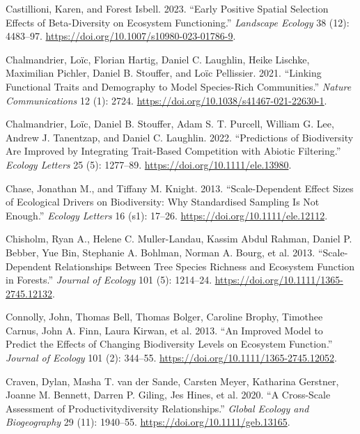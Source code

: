 \documentclass[
  letterpaper,
  DIV=11,
  numbers=noendperiod]{scrartcl}
\newlength{\cslhangindent}
\newenvironment{CSLReferences}[2] %
 {\begin{list}{}{%
  \setlength{\itemindent}{0pt}
  \setlength{\leftmargin}{0pt}
  \setlength{\parsep}{0pt}
  \ifodd #1
   \setlength{\leftmargin}{\cslhangindent}
   \setlength{\itemindent}{-1\cslhangindent}
  \fi
  \setlength{\itemsep}{#2\baselineskip}}}
 {\end{list}}
\begin{document}
\begin{CSLReferences}{1}{0}
Castillioni, Karen, and Forest Isbell. 2023. {``Early Positive Spatial
Selection Effects of Beta-Diversity on Ecosystem Functioning.''}
\emph{Landscape Ecology} 38 (12): 4483--97.
\url{https://doi.org/10.1007/s10980-023-01786-9}.

Chalmandrier, Loïc, Florian Hartig, Daniel C. Laughlin, Heike Lischke,
Maximilian Pichler, Daniel B. Stouffer, and Loïc Pellissier. 2021.
{``Linking Functional Traits and Demography to Model Species-Rich
Communities.''} \emph{Nature Communications} 12 (1): 2724.
\url{https://doi.org/10.1038/s41467-021-22630-1}.

Chalmandrier, Loïc, Daniel B. Stouffer, Adam S. T. Purcell, William G.
Lee, Andrew J. Tanentzap, and Daniel C. Laughlin. 2022. {``Predictions
of Biodiversity Are Improved by Integrating Trait-Based Competition with
Abiotic Filtering.''} \emph{Ecology Letters} 25 (5): 1277--89.
\url{https://doi.org/10.1111/ele.13980}.

Chase, Jonathan M., and Tiffany M. Knight. 2013. {``Scale-Dependent
Effect Sizes of Ecological Drivers on Biodiversity: Why Standardised
Sampling Is Not Enough.''} \emph{Ecology Letters} 16 (s1): 17--26.
\url{https://doi.org/10.1111/ele.12112}.

Chisholm, Ryan A., Helene C. Muller-Landau, Kassim Abdul Rahman, Daniel
P. Bebber, Yue Bin, Stephanie A. Bohlman, Norman A. Bourg, et al. 2013.
{``Scale-Dependent Relationships Between Tree Species Richness and
Ecosystem Function in Forests.''} \emph{Journal of Ecology} 101 (5):
1214--24. \url{https://doi.org/10.1111/1365-2745.12132}.

Connolly, John, Thomas Bell, Thomas Bolger, Caroline Brophy, Timothee
Carnus, John A. Finn, Laura Kirwan, et al. 2013. {``An Improved Model to
Predict the Effects of Changing Biodiversity Levels on Ecosystem
Function.''} \emph{Journal of Ecology} 101 (2): 344--55.
\url{https://doi.org/10.1111/1365-2745.12052}.

Craven, Dylan, Masha T. van der Sande, Carsten Meyer, Katharina
Gerstner, Joanne M. Bennett, Darren P. Giling, Jes Hines, et al. 2020.
{``A Cross-Scale Assessment of Productivity{\textendash}diversity
Relationships.''} \emph{Global Ecology and Biogeography} 29 (11):
1940--55. \url{https://doi.org/10.1111/geb.13165}.


\end{CSLReferences}
\end{document}
